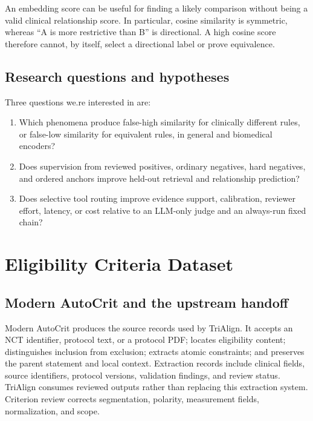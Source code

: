 \documentclass[10pt,letterpaper]{article}
\begin{document}
An embedding score can be useful for finding a likely comparison without being
a valid clinical relationship score. In particular, cosine similarity is
symmetric, whereas ``A is more restrictive than B'' is directional. A high
cosine score therefore cannot, by itself, select a directional label or prove
equivalence.

\subsection{Research questions and hypotheses}
Three questions we.re interested in are:
\begin{enumerate}
\item Which phenomena produce false-high similarity for clinically different
rules, or false-low similarity for equivalent rules, in general and biomedical
encoders?
\item Does supervision from reviewed positives, ordinary negatives, hard
negatives, and ordered anchors improve held-out retrieval and relationship
prediction?
\item Does selective tool routing improve evidence support, calibration,
reviewer effort, latency, or cost relative to an LLM-only judge and an
always-run fixed chain?
\end{enumerate}

\section{Eligibility Criteria Dataset}
\label{sec:data}

\subsection{Modern AutoCrit and the upstream handoff}
Modern AutoCrit produces the source records used by TriAlign. It accepts an
NCT identifier, protocol text, or a protocol PDF; locates eligibility content;
distinguishes inclusion from exclusion; extracts atomic constraints; and
preserves the parent statement and local context. Extraction records include
clinical fields, source identifiers, protocol versions, validation findings,
and review status. TriAlign consumes reviewed outputs rather than replacing
this extraction system. Criterion review corrects segmentation, polarity, measurement fields,
normalization, and scope.
\end{document}
